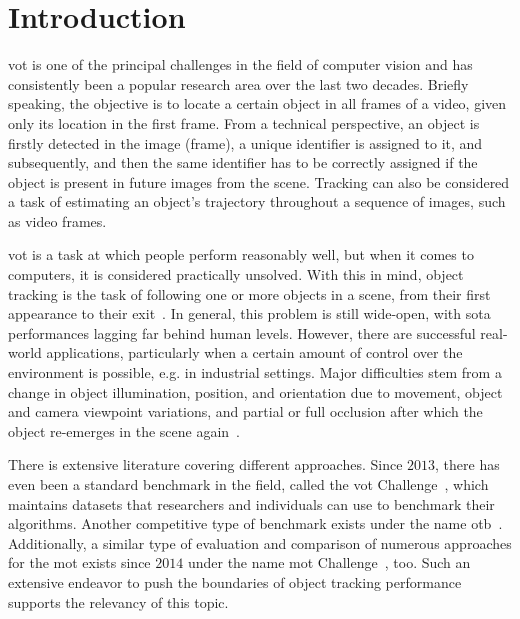 \chapter{Introduction}
\label{chap:Introduction}

\Gls{vot} is one of the principal challenges in the field of computer vision and has consistently been a popular research area over the last two decades. Briefly speaking, the objective is to locate a certain object in all frames of a video, given only its location in the first frame. From a technical perspective, an object is firstly detected in the image (frame), a unique identifier is assigned to it, and subsequently, and then the same identifier has to be correctly assigned if the object is present in future images from the scene. Tracking can also be considered a task of estimating an object’s trajectory throughout a sequence of images, such as video frames.

\Gls{vot} is a task at which people perform reasonably well, but when it comes to computers, it is considered practically unsolved. With this in mind, object tracking is the task of following one or more objects in a scene, from their first appearance to their exit~\cite{forsyth2012computer}. In general, this problem is still wide-open, with \gls{sota} performances lagging far behind human levels. However, there are successful real-world applications, particularly when a certain amount of control over the environment is possible, e.g. in industrial settings. Major difficulties stem from a change in object illumination, position, and orientation due to movement, object and camera viewpoint variations, and partial or full occlusion after which the object re-emerges in the scene again~\cite{jalal2012sotavot}.

There is extensive literature covering different approaches. Since $2013$, there has even been a standard benchmark in the field, called the \gls{vot} Challenge~\cite{webvotchallenge}, which maintains datasets that researchers and individuals can use to benchmark their algorithms. Another competitive type of benchmark exists under the name \gls{otb}~\cite{wu2015otb}. Additionally, a similar type of evaluation and comparison of numerous approaches for the \gls{mot} exists since $2014$ under the name \gls{mot} Challenge~\cite{webmotchallenge}, too. Such an extensive endeavor to push the boundaries of object tracking performance supports the relevancy of this topic.

